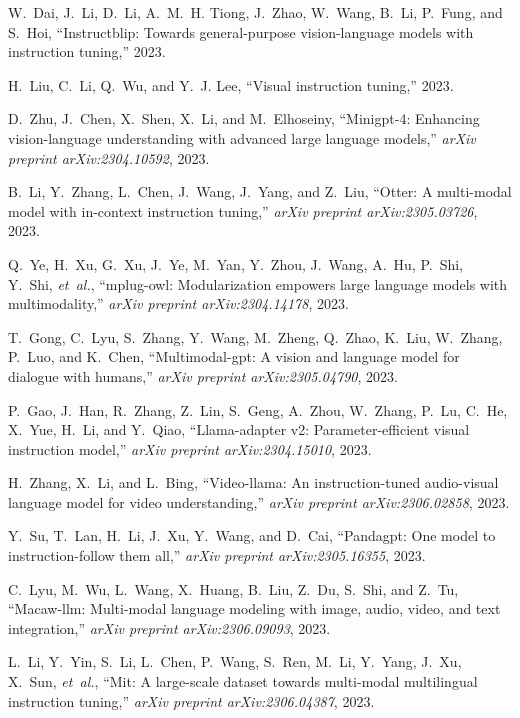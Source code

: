 \begin{thebibliography}{10}
W.~Dai, J.~Li, D.~Li, A.~M.~H. Tiong, J.~Zhao, W.~Wang, B.~Li, P.~Fung, and
  S.~Hoi, ``Instructblip: Towards general-purpose vision-language models with
  instruction tuning,'' 2023.

H.~Liu, C.~Li, Q.~Wu, and Y.~J. Lee, ``Visual instruction tuning,'' 2023.

D.~Zhu, J.~Chen, X.~Shen, X.~Li, and M.~Elhoseiny, ``Minigpt-4: Enhancing
  vision-language understanding with advanced large language models,'' {\em
  arXiv preprint arXiv:2304.10592}, 2023.

B.~Li, Y.~Zhang, L.~Chen, J.~Wang, J.~Yang, and Z.~Liu, ``Otter: A multi-modal
  model with in-context instruction tuning,'' {\em arXiv preprint
  arXiv:2305.03726}, 2023.

Q.~Ye, H.~Xu, G.~Xu, J.~Ye, M.~Yan, Y.~Zhou, J.~Wang, A.~Hu, P.~Shi, Y.~Shi,
  {\em et~al.}, ``mplug-owl: Modularization empowers large language models with
  multimodality,'' {\em arXiv preprint arXiv:2304.14178}, 2023.

T.~Gong, C.~Lyu, S.~Zhang, Y.~Wang, M.~Zheng, Q.~Zhao, K.~Liu, W.~Zhang,
  P.~Luo, and K.~Chen, ``Multimodal-gpt: A vision and language model for
  dialogue with humans,'' {\em arXiv preprint arXiv:2305.04790}, 2023.

P.~Gao, J.~Han, R.~Zhang, Z.~Lin, S.~Geng, A.~Zhou, W.~Zhang, P.~Lu, C.~He,
  X.~Yue, H.~Li, and Y.~Qiao, ``Llama-adapter v2: Parameter-efficient visual
  instruction model,'' {\em arXiv preprint arXiv:2304.15010}, 2023.

H.~Zhang, X.~Li, and L.~Bing, ``Video-llama: An instruction-tuned audio-visual
  language model for video understanding,'' {\em arXiv preprint
  arXiv:2306.02858}, 2023.

Y.~Su, T.~Lan, H.~Li, J.~Xu, Y.~Wang, and D.~Cai, ``Pandagpt: One model to
  instruction-follow them all,'' {\em arXiv preprint arXiv:2305.16355}, 2023.

C.~Lyu, M.~Wu, L.~Wang, X.~Huang, B.~Liu, Z.~Du, S.~Shi, and Z.~Tu,
  ``Macaw-llm: Multi-modal language modeling with image, audio, video, and text
  integration,'' {\em arXiv preprint arXiv:2306.09093}, 2023.

L.~Li, Y.~Yin, S.~Li, L.~Chen, P.~Wang, S.~Ren, M.~Li, Y.~Yang, J.~Xu, X.~Sun,
  {\em et~al.}, ``Mit: A large-scale dataset towards multi-modal multilingual
  instruction tuning,'' {\em arXiv preprint arXiv:2306.04387}, 2023.


\end{thebibliography}
